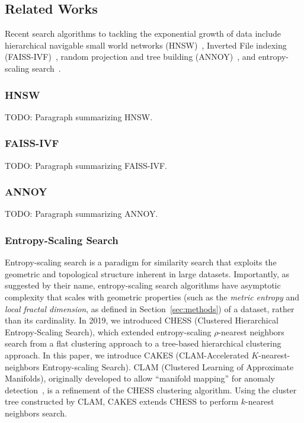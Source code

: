 \subsection{Related Works}
\label{subsec:intoduction:related-works}

Recent search algorithms to tackling the exponential growth of data include hierarchical navigable small world networks (HNSW)~\cite{Malkov2016EfficientAR}, Inverted File indexing (FAISS-IVF)~\cite{johnson2019billion}, random projection and tree building (ANNOY)~\cite{annoy}, and entropy-scaling search~\cite{yu2015entropy, ishaq2019clustered}.

\subsubsection{HNSW}
\label{subsubsec:introduction:related-works:hnsw}

TODO: Paragraph summarizing HNSW.

\subsubsection{FAISS-IVF}
\label{subsubsec:introduction:related-works:faiss-ivf}

TODO: Paragraph summarizing FAISS-IVF.

\subsubsection{ANNOY}
\label{subsubsec:introduction:related-works:annoy}

TODO: Paragraph summarizing ANNOY.

\subsubsection{Entropy-Scaling Search}
\label{subsubsec:introduction:related-works:entropy-scaling-search}

Entropy-scaling search is a paradigm for similarity search that exploits the geometric and topological structure inherent in large datasets.
Importantly, as suggested by their name, entropy-scaling search algorithms have asymptotic complexity that scales with geometric properties (such as the \emph{metric entropy} and \emph{local fractal dimension}, as defined in Section~\ref{sec:methods}) of a dataset, rather than its cardinality.
In 2019, we introduced CHESS (Clustered Hierarchical Entropy-Scaling Search), which extended entropy-scaling $\rho$-nearest neighbors search from a flat clustering approach to a tree-based hierarchical clustering approach.
In this paper, we introduce CAKES (CLAM-Accelerated $K$-nearest-neighbors Entropy-scaling Search).
CLAM (Clustered Learning of Approximate Manifolds), originally developed to allow ``manifold mapping'' for anomaly detection~\cite{ishaq2021clustered}, is a refinement of the CHESS clustering algorithm. 
Using the cluster tree constructed by CLAM, CAKES extends CHESS to perform $k$-nearest neighbors search.
